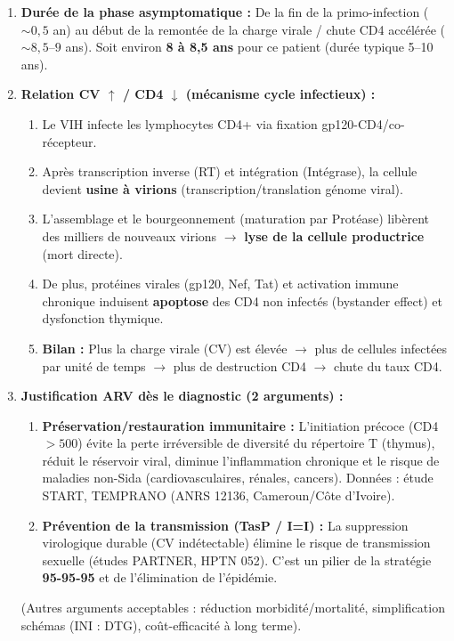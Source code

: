 \documentclass[11pt]{article}
\begin{document}
\begin{corrige}
\begin{enumerate}
\textbf{Signification biologique :} Niveau d'équilibre transitoire entre \textbf{réplication virale} et \textbf{réponse immune cytotoxique (CD8+)}. Il prédit la vitesse de progression : un \emph{set point} bas = progression lente ; un \emph{set point} haut = progression rapide. Ici, $\sim 120$ u.a. correspond à un \emph{set point} modéré.
\item \textbf{Durée de la phase asymptomatique :} De la fin de la primo-infection ($\sim 0,5$ an) au début de la remontée de la charge virale / chute CD4 accélérée ($\sim 8,5$--$9$ ans). Soit environ \textbf{8 à 8,5 ans} pour ce patient (durée typique 5--10 ans).
\item \textbf{Relation CV $\uparrow$ / CD4 $\downarrow$ (mécanisme cycle infectieux) :}
\begin{enumerate}
\item Le VIH infecte les lymphocytes CD4+ via fixation gp120-CD4/co-récepteur.
\item Après transcription inverse (RT) et intégration (Intégrase), la cellule devient \textbf{usine à virions} (transcription/translation génome viral).
\item L'assemblage et le bourgeonnement (maturation par Protéase) libèrent des milliers de nouveaux virions $\to$ \textbf{lyse de la cellule productrice} (mort directe).
\item De plus, protéines virales (gp120, Nef, Tat) et activation immune chronique induisent \textbf{apoptose} des CD4 non infectés (bystander effect) et dysfonction thymique.
\item \textbf{Bilan :} Plus la charge virale (CV) est élevée $\to$ plus de cellules infectées par unité de temps $\to$ plus de destruction CD4 $\to$ chute du taux CD4.
\end{enumerate}
\item \textbf{Justification ARV dès le diagnostic (2 arguments) :}
\begin{enumerate}
\item \textbf{Préservation/restauration immunitaire :} L'initiation précoce (CD4 $> 500$) évite la perte irréversible de diversité du répertoire T (thymus), réduit le réservoir viral, diminue l'inflammation chronique et le risque de maladies non-Sida (cardiovasculaires, rénales, cancers). Données : étude START, TEMPRANO (ANRS 12136, Cameroun/Côte d'Ivoire).
\item \textbf{Prévention de la transmission (TasP / I=I) :} La suppression virologique durable (CV indétectable) élimine le risque de transmission sexuelle (études PARTNER, HPTN 052). C'est un pilier de la stratégie \textbf{95-95-95} et de l'élimination de l'épidémie.
\end{enumerate}
(Autres arguments acceptables : réduction morbidité/mortalité, simplification schémas (INI : DTG), coût-efficacité à long terme).
\end{enumerate}
\end{corrige}
\end{document}
